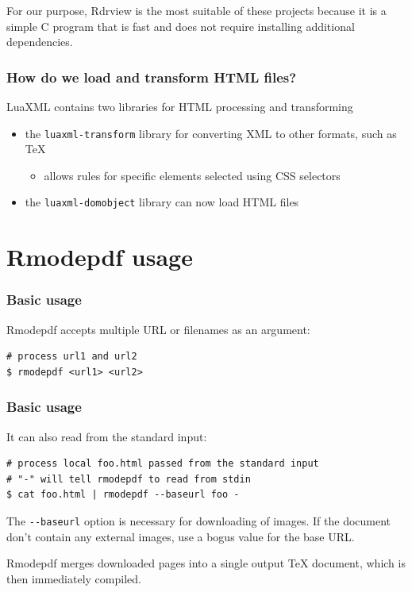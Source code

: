 For our purpose, Rdrview is the most suitable of these projects because it is a
simple C program that is fast and does not require installing additional
dependencies.



\begin{frame}[fragile]
  \frametitle{How do we load and transform HTML files?}
  LuaXML contains two libraries for HTML processing and transforming
  \begin{itemize}
    \item the \verb|luaxml-transform| library for converting XML to other formats, such as \TeX
      \begin{itemize}
        \item allows rules for specific elements selected using CSS selectors
      \end{itemize}
    \item the \verb|luaxml-domobject| library can now load HTML files
  \end{itemize}
\end{frame}

\section{Rmodepdf usage}

\begin{frame}[fragile]
  \frametitle{Basic usage}

  Rmodepdf accepts multiple URL or filenames as an argument:

\begin{verbatim}
# process url1 and url2
$ rmodepdf <url1> <url2>
\end{verbatim}
\end{frame}

\begin{frame}[fragile]
  \frametitle{Basic usage}
It can also read from the standard input:

\begin{verbatim}
# process local foo.html passed from the standard input
# "-" will tell rmodepdf to read from stdin
$ cat foo.html | rmodepdf --baseurl foo - 
\end{verbatim}
\end{frame}

The \verb|--baseurl| option is necessary for downloading of images. If the document don't contain any external images, 
use a bogus value for the base URL.

Rmodepdf merges downloaded pages into a single output TeX document, which is then immediately compiled.


